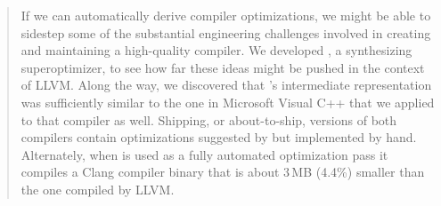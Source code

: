 \begin{abstract}
%
If we can automatically derive compiler optimizations, we might be
able to sidestep some of the substantial engineering challenges
involved in creating and maintaining a high-quality compiler.
%
We developed \tool{}, a synthesizing superoptimizer, to see how far
these ideas might be pushed in the context of LLVM\@.
%
Along the way, we discovered that \tool's intermediate representation
was sufficiently similar to the one in Microsoft Visual C++ that
we applied \tool{} to that compiler as well.
%
Shipping, or about-to-ship, versions of both compilers contain
optimizations suggested by \tool{} but implemented by hand.
%
Alternately, when \tool{} is used as a fully automated optimization
pass it compiles a Clang compiler binary that is about 3\,MB (4.4\%)
smaller than the one compiled by LLVM\@.
%
\end{abstract}
